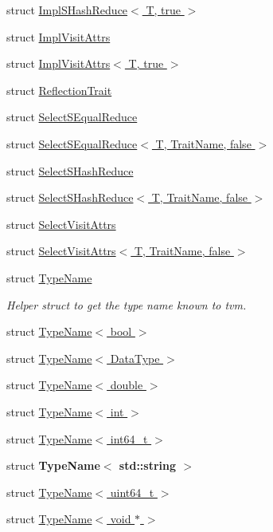 \begin{DoxyCompactItemize}
\item 
struct \hyperlink{structtvm_1_1detail_1_1ImplSHashReduce_3_01T_00_01true_01_4}{Impl\+S\+Hash\+Reduce$<$ T, true $>$}
\item 
struct \hyperlink{structtvm_1_1detail_1_1ImplVisitAttrs}{Impl\+Visit\+Attrs}
\item 
struct \hyperlink{structtvm_1_1detail_1_1ImplVisitAttrs_3_01T_00_01true_01_4}{Impl\+Visit\+Attrs$<$ T, true $>$}
\item 
struct \hyperlink{structtvm_1_1detail_1_1ReflectionTrait}{Reflection\+Trait}
\item 
struct \hyperlink{structtvm_1_1detail_1_1SelectSEqualReduce}{Select\+S\+Equal\+Reduce}
\item 
struct \hyperlink{structtvm_1_1detail_1_1SelectSEqualReduce_3_01T_00_01TraitName_00_01false_01_4}{Select\+S\+Equal\+Reduce$<$ T, Trait\+Name, false $>$}
\item 
struct \hyperlink{structtvm_1_1detail_1_1SelectSHashReduce}{Select\+S\+Hash\+Reduce}
\item 
struct \hyperlink{structtvm_1_1detail_1_1SelectSHashReduce_3_01T_00_01TraitName_00_01false_01_4}{Select\+S\+Hash\+Reduce$<$ T, Trait\+Name, false $>$}
\item 
struct \hyperlink{structtvm_1_1detail_1_1SelectVisitAttrs}{Select\+Visit\+Attrs}
\item 
struct \hyperlink{structtvm_1_1detail_1_1SelectVisitAttrs_3_01T_00_01TraitName_00_01false_01_4}{Select\+Visit\+Attrs$<$ T, Trait\+Name, false $>$}
\item 
struct \hyperlink{structtvm_1_1detail_1_1TypeName}{Type\+Name}
\begin{DoxyCompactList}\small\item\em Helper struct to get the type name known to tvm. \end{DoxyCompactList}\item 
struct \hyperlink{structtvm_1_1detail_1_1TypeName_3_01bool_01_4}{Type\+Name$<$ bool $>$}
\item 
struct \hyperlink{structtvm_1_1detail_1_1TypeName_3_01DataType_01_4}{Type\+Name$<$ Data\+Type $>$}
\item 
struct \hyperlink{structtvm_1_1detail_1_1TypeName_3_01double_01_4}{Type\+Name$<$ double $>$}
\item 
struct \hyperlink{structtvm_1_1detail_1_1TypeName_3_01int_01_4}{Type\+Name$<$ int $>$}
\item 
struct \hyperlink{structtvm_1_1detail_1_1TypeName_3_01int64__t_01_4}{Type\+Name$<$ int64\+\_\+t $>$}
\item 
struct {\bfseries Type\+Name$<$ std\+::string $>$}
\item 
struct \hyperlink{structtvm_1_1detail_1_1TypeName_3_01uint64__t_01_4}{Type\+Name$<$ uint64\+\_\+t $>$}
\item 
struct \hyperlink{structtvm_1_1detail_1_1TypeName_3_01void_01_5_01_4}{Type\+Name$<$ void $\ast$ $>$}
\end{DoxyCompactItemize}
